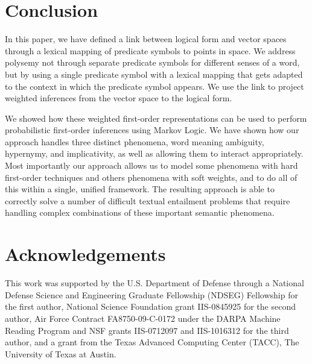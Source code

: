 \section{Conclusion}

In this paper, we have defined a link between logical form and vector
spaces through a lexical mapping of predicate symbols to points in
space. We address polysemy not through separate predicate symbols for
different senses of a word, but by using a single predicate symbol
with a lexical mapping that gets
adapted to the context in which the predicate symbol appears. We use
the link to project weighted inferences from the vector space to the
logical form. 

We showed how these weighted first-order
representations can be used to perform probabilistic first-order inferences
using Markov Logic.  We have shown how our approach handles three distinct
phenomena, word meaning ambiguity, hypernymy, and implicativity, as well as
allowing them to interact appropriately.  Most importantly our approach allows 
us to model some phenomena with hard first-order techniques and
others phenomena with soft weights, and to do all of this within a
single, unified framework.
The resulting approach is able to correctly solve a number of difficult
textual entailment problems that require handling complex combinations of these
important semantic phenomena.




\section*{Acknowledgements}

This work was supported by the U.S. Department of Defense through a National
Defense Science and Engineering Graduate Fellowship (NDSEG) Fellowship for the
first author, National Science Foundation grant IIS-0845925 for the second
author, Air Force Contract FA8750-09-C-0172 under the DARPA Machine Reading
Program and NSF grants IIS-0712097 and IIS-1016312 for the third author, and a
grant from the Texas Advanced Computing Center (TACC), The University of Texas
at Austin.
